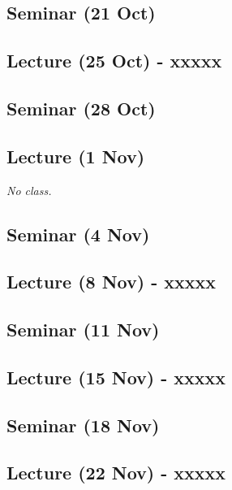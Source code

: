 \documentclass[12pt, a4paper]{article}
\begin{document}
\subsection*{Seminar (21 Oct)}

\subsection*{Lecture (25 Oct) - xxxxx}

\subsection*{Seminar (28 Oct)}

\subsection*{Lecture (1 Nov) {\color{red}{(No class)}}}

\textit{No class.}

\subsection*{Seminar (4 Nov)}

\subsection*{Lecture (8 Nov) - xxxxx}

\subsection*{Seminar (11 Nov)}

\subsection*{Lecture (15 Nov) - xxxxx}

\subsection*{Seminar (18 Nov)}

\subsection*{Lecture (22 Nov) - xxxxx}
\end{document}
